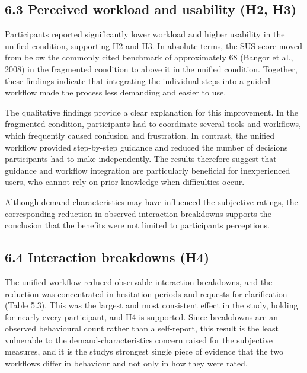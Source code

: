 \documentclass[
]{article}
\begin{document}
\hypertarget{perceived-workload-and-usability-h2-h3}{%
\subsection{6.3 Perceived workload and usability (H2, H3)}\label{perceived-workload-and-usability-h2-h3}}

Participants reported significantly lower workload and higher usability in the unified condition, supporting H2 and H3. In absolute terms, the SUS score moved from below the commonly cited benchmark of approximately 68 (Bangor et al., 2008) in the fragmented condition to above it in the unified condition. Together, these findings indicate that integrating the individual steps into a guided workflow made the process less demanding and easier to use.

The qualitative findings provide a clear explanation for this improvement. In the fragmented condition, participants had to coordinate several tools and workflows, which frequently caused confusion and frustration. In contrast, the unified workflow provided step-by-step guidance and reduced the number of decisions participants had to make independently. The results therefore suggest that guidance and workflow integration are particularly beneficial for inexperienced users, who cannot rely on prior knowledge when difficulties occur.

Although demand characteristics may have influenced the subjective ratings, the corresponding reduction in observed interaction breakdowns supports the conclusion that the benefits were not limited to participants\textquotesingle{} perceptions.

\hypertarget{interaction-breakdowns-h4-1}{%
\subsection{6.4 Interaction breakdowns (H4)}\label{interaction-breakdowns-h4-1}}

The unified workflow reduced observable interaction breakdowns, and the reduction was concentrated in hesitation periods and requests for clarification (Table 5.3). This was the largest and most consistent effect in the study, holding for nearly every participant, and H4 is supported. Since breakdowns are an observed behavioural count rather than a self-report, this result is the least vulnerable to the demand-characteristics concern raised for the subjective measures, and it is the study\textquotesingle s strongest single piece of evidence that the two workflows differ in behaviour and not only in how they were rated.
\end{document}
